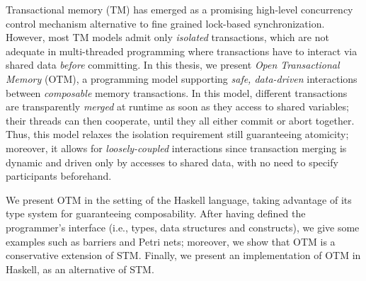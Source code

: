 
Transactional memory (TM) has emerged as a promising high-level concurrency control mechanism alternative to fine grained lock-based synchronization.
However, most TM models admit only \emph{isolated} transactions, which are not adequate in multi-threaded programming where transactions have to interact via shared data \emph{before} committing.
In this thesis, we present \emph{Open Transactional Memory} (OTM), a programming model supporting \emph{safe, data-driven} interactions between \emph{composable} memory transactions.
In this model, different transactions are transparently \emph{merged} at runtime as soon as they access to shared variables; their threads can then cooperate, until they all either commit or abort together.
Thus, this model relaxes the isolation requirement still guaranteeing atomicity; moreover, it allows for \emph{loosely-coupled} interactions since transaction merging is dynamic and driven only by accesses to shared data, with no need to specify participants beforehand.

We present OTM in the setting of the Haskell language, taking advantage of its type system for guaranteeing composability.  
After having defined the programmer's interface (i.e., types, data structures and constructs), we give some examples such as barriers and Petri nets; moreover, we show that OTM is a conservative extension of STM.
Finally, we present an implementation of OTM in Haskell, as an alternative of STM.